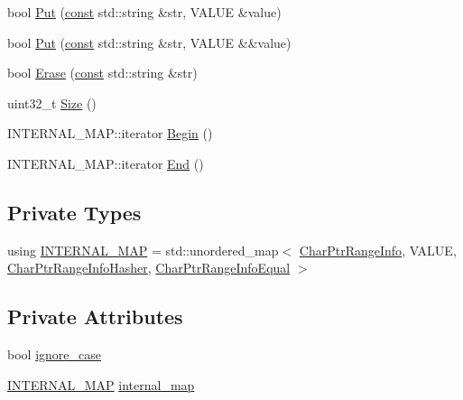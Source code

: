 \begin{DoxyCompactItemize}
\item 
bool \mbox{\hyperlink{classlucene_1_1core_1_1analysis_1_1characterutil_1_1CharMap_aa93ef6c5bfec74a0533a9cd967adfc59}{Put}} (\mbox{\hyperlink{ZlibCrc32_8h_a2c212835823e3c54a8ab6d95c652660e}{const}} std\+::string \&str, V\+A\+L\+UE \&value)
\item 
bool \mbox{\hyperlink{classlucene_1_1core_1_1analysis_1_1characterutil_1_1CharMap_a72fcb8b83852bb787de1204635d3bf21}{Put}} (\mbox{\hyperlink{ZlibCrc32_8h_a2c212835823e3c54a8ab6d95c652660e}{const}} std\+::string \&str, V\+A\+L\+UE \&\&value)
\item 
bool \mbox{\hyperlink{classlucene_1_1core_1_1analysis_1_1characterutil_1_1CharMap_aa6267a07cdbe6c0d52c02ddad71c52ab}{Erase}} (\mbox{\hyperlink{ZlibCrc32_8h_a2c212835823e3c54a8ab6d95c652660e}{const}} std\+::string \&str)
\item 
uint32\+\_\+t \mbox{\hyperlink{classlucene_1_1core_1_1analysis_1_1characterutil_1_1CharMap_a25bb4efe350f8848e264f63daf72f23e}{Size}} ()
\item 
I\+N\+T\+E\+R\+N\+A\+L\+\_\+\+M\+A\+P\+::iterator \mbox{\hyperlink{classlucene_1_1core_1_1analysis_1_1characterutil_1_1CharMap_a468af607829ccc32601ebb45c1363c7e}{Begin}} ()
\item 
I\+N\+T\+E\+R\+N\+A\+L\+\_\+\+M\+A\+P\+::iterator \mbox{\hyperlink{classlucene_1_1core_1_1analysis_1_1characterutil_1_1CharMap_a036c1820bceb5120f18a798b46db10d0}{End}} ()
\end{DoxyCompactItemize}
\subsection*{Private Types}
\begin{DoxyCompactItemize}
\item 
using \mbox{\hyperlink{classlucene_1_1core_1_1analysis_1_1characterutil_1_1CharMap_a0fe744ab48aa6f998a3d7e159a351d69}{I\+N\+T\+E\+R\+N\+A\+L\+\_\+\+M\+AP}} = std\+::unordered\+\_\+map$<$ \mbox{\hyperlink{classlucene_1_1core_1_1analysis_1_1characterutil_1_1CharPtrRangeInfo}{Char\+Ptr\+Range\+Info}}, V\+A\+L\+UE, \mbox{\hyperlink{classlucene_1_1core_1_1analysis_1_1characterutil_1_1CharPtrRangeInfoHasher}{Char\+Ptr\+Range\+Info\+Hasher}}, \mbox{\hyperlink{classlucene_1_1core_1_1analysis_1_1characterutil_1_1CharPtrRangeInfoEqual}{Char\+Ptr\+Range\+Info\+Equal}} $>$
\end{DoxyCompactItemize}
\subsection*{Private Attributes}
\begin{DoxyCompactItemize}
\item 
bool \mbox{\hyperlink{classlucene_1_1core_1_1analysis_1_1characterutil_1_1CharMap_a1a62994159ecb2e6767c0d67238ad35c}{ignore\+\_\+case}}
\item 
\mbox{\hyperlink{classlucene_1_1core_1_1analysis_1_1characterutil_1_1CharMap_a0fe744ab48aa6f998a3d7e159a351d69}{I\+N\+T\+E\+R\+N\+A\+L\+\_\+\+M\+AP}} \mbox{\hyperlink{classlucene_1_1core_1_1analysis_1_1characterutil_1_1CharMap_aa86d94ea61970d00283d8eb72d12e1cf}{internal\+\_\+map}}
\end{DoxyCompactItemize}



